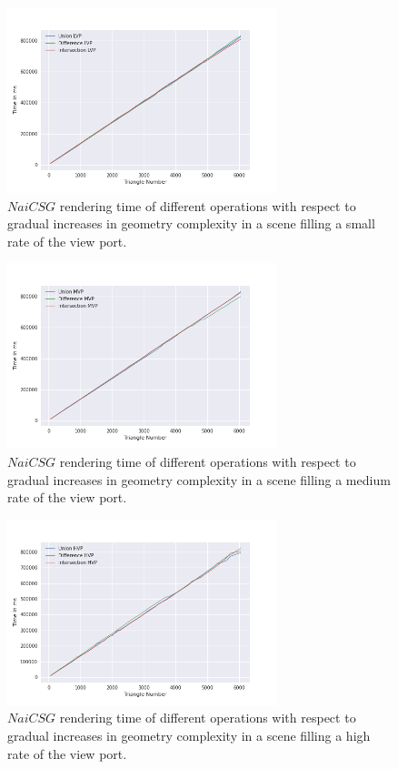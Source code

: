\documentclass[a4paper,11pt,oneside]{article}
\begin{document}
\begin{figure}[H]
	\centering
	\includegraphics[width=0.7\textwidth]{section5/plots/naive_csg_lvp.png}
	\caption{$NaiCSG$ rendering time of different operations with respect to gradual increases in geometry complexity in a scene filling a small rate of the view port.}
	\label{sec5.1:naive_operations_lvp}
\end{figure}

\begin{figure}[H]
	\centering
	\includegraphics[width=0.7\textwidth]{section5/plots/naive_csg_mvp.png}
	\caption{$NaiCSG$ rendering time of different operations with respect to gradual increases in geometry complexity in a scene filling a medium rate of the view port.}
	\label{sec5.1:naive_operations_mvp}
\end{figure}

\begin{figure}[H]
	\centering
	\includegraphics[width=0.7\textwidth]{section5/plots/naive_csg_hvp.png}
	\caption{$NaiCSG$ rendering time of different operations with respect to gradual increases in geometry complexity in a scene filling a high rate of the view port.}
	\label{sec5.1:naive_operations_hvp}
\end{figure}
\end{document}
